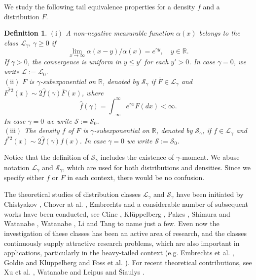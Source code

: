 \documentclass[12pt,leqno]{amsart}
\newtheorem{definition}[lemma]{Definition}
\newcommand{\R}{\mathbb{R}}
\newcommand{\ov}{\overline}
\newcommand{\wh}{\widehat}
\newcommand{\cals}{{\mathcal S}}
\newcommand{\call}{{\mathcal L}}
\newcommand{\1}{{\mathbf 1}}
\begin{document}
We study the following tail equivalence properties for a density $f$ and a distribution $F$. 
\begin{definition} 
$(\mathrm{i})$ A non-negative measurable function $\alpha (x)$ belongs to the class $\call_\gamma,\,\gamma\ge 0$ 
if 
\[
 \lim_{x\to\infty} \alpha (x-y)/\alpha(x) = e^{\gamma y},\quad y\in \R.
\]
If $\gamma>0$, the convergence is uniform in $y\le y'$ for each $y'>0$. 
In case $\gamma=0$, we write $\call:=\call_0$. \\
$(\mathrm{ii})$ $F$ is $\gamma$-subexponential on $\R$, denoted by $\cals_\gamma$ if $\ov F \in \call_\gamma$ 
and $\ov {F^{\ast 2}}(x) \sim 2 \wh f (\gamma) \ov F(x)$, where 
\[
\wh f (\gamma) = \int_{-\infty}^{\infty}e^{\gamma x}F(dx)<\infty.
\]
In case $\gamma=0$ we write $\cals:=\cals_0$. \\
$(\mathrm{iii})$ The density $f$ of $F$ is $\gamma$-subexponential on $\R$, denoted by $\cals_\gamma$, 
if $f\in \call_\gamma$ and $f^{\ast 2}(x) \sim 2\wh f(\gamma) f(x)$. In case $\gamma=0$ we write $\cals:=\cals_0$.
\end{definition} 
Notice that the definition of $\cals_\gamma$ includes the existence of $\gamma$-moment. 
We abuse notation $\call_\gamma$ and $\cals_\gamma$, which are used for both distributions and densities. 
Since we specify either $f$ or $F$ in each context, there would be no confusion. 

The theoretical studies of distribution classes $\call_\gamma$ and $\cals_\gamma$ have been initiated by 
Chistyakov \cite{Chistyakov:1964}, Chover at al. \cite{Chover:Ney:Wainger:1973a,Chover:Ney:Wainger:1973b}, 
Embrechts \cite{Embrechts:Goldie:1980,Embrechts:Goldie:1982} and a considerable number of 
subsequent works have been conducted, see Cline \cite{Cline:1986,Cline:1987}, Kl\"uppelberg \cite{Kluppelberg:1988,Kluppelberg:1989},
Pakes \cite{Pakes:2004}, Shimura and Watanabe \cite{Shimura:Watanabe:2005}, Watanabe \cite{Watanabe:2008}, Li and Tang \cite{Li:Tang:2010} to 
name just a few. 
Even now the investigation of these classes has been an active area of research, 
and the classes continuously supply attractive research problems, which are also important in applications, 
particularly in the heavy-tailed context (e.g. Embrechts et al. \cite{embrechts:kluppelberg:mikosch:1997}, Goldie and Kl\"uppelberg \cite{Goldie:Kluppelberg:2998} 
and Foss et al. \cite{Foss:Korshunov:Zachary:2013}). 
For recent theoretical contributions, see Xu et al. \cite{Xu:Foss:Wang:2015}, Watanabe \cite{Watanabe:2019} and Leipus and \v{S}iaulys \cite{Leipus:Siaulys:2020}.  
\end{document}
